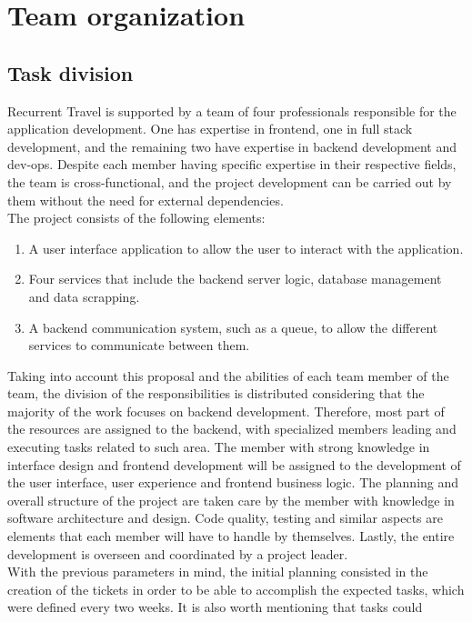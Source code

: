 \documentclass[../memory.tex]{subfiles}
\begin{document}
\chapter{Team organization}
\section{Task division}
Recurrent Travel is supported by a team of four professionals responsible for
the application development. One has expertise in frontend, one in full stack
development, and the remaining two have expertise in backend development and
dev-ops. Despite each member having specific expertise in their respective
fields, the team is cross-functional, and the project development can be carried
out by them without the need for external dependencies.
\\
The project consists of the following elements:
\begin{enumerate}[label = -]
	\item A user interface application to allow the user to interact with the
	      application.
	\item Four services that include the backend server logic, database management
	      and data scrapping.
	\item A backend communication system, such as a queue, to allow the different
	      services to communicate between them.
\end{enumerate}
Taking into account this proposal and the abilities of each team member of the
team, the division of the responsibilities is distributed considering that the
majority of the work focuses on backend development. Therefore, most part of the
resources are assigned to the backend, with specialized members leading and
executing tasks related to such area. The member with strong knowledge in
interface design and frontend development will be assigned to the development of
the user interface, user experience and frontend business logic. The planning
and overall structure of the project are taken care by the member with knowledge
in software architecture and design. Code quality, testing and similar aspects
are elements that each member will have to handle by themselves. Lastly, the
entire development is overseen and coordinated by a project leader.
\\[8pt]
With the previous parameters in mind, the initial planning consisted in the
creation of the tickets in order to be able to accomplish the expected tasks,
which were defined every two weeks. It is also worth mentioning that tasks could
\end{document}
